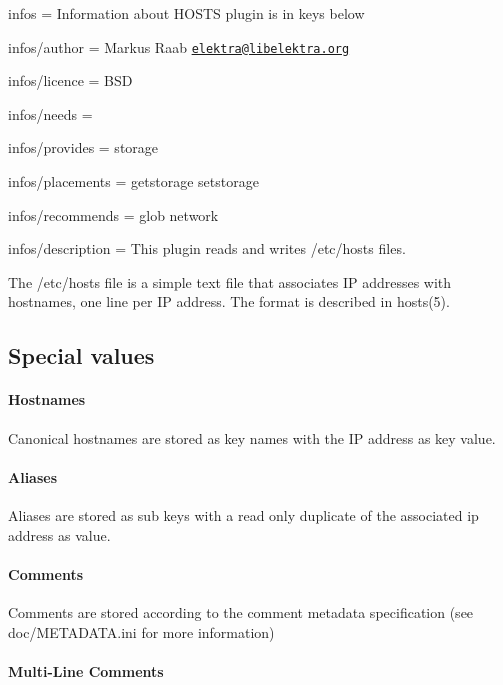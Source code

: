 
\begin{DoxyItemize}
\item infos = Information about H\+O\+S\+T\+S plugin is in keys below
\item infos/author = Markus Raab \href{mailto:elektra@libelektra.org}{\tt elektra@libelektra.\+org}
\item infos/licence = B\+S\+D
\item infos/needs =
\item infos/provides = storage
\item infos/placements = getstorage setstorage
\item infos/recommends = glob network
\item infos/description = This plugin reads and writes /etc/hosts files.
\end{DoxyItemize}

The /etc/hosts file is a simple text file that associates I\+P addresses with hostnames, one line per I\+P address. The format is described in hosts(5).

\subsection*{Special values}

\paragraph*{Hostnames}

Canonical hostnames are stored as key names with the I\+P address as key value.

\paragraph*{Aliases}

Aliases are stored as sub keys with a read only duplicate of the associated ip address as value.

\paragraph*{Comments}

Comments are stored according to the comment metadata specification (see doc/\+M\+E\+T\+A\+D\+A\+T\+A.\+ini for more information)

\paragraph*{Multi-\/\+Line Comments}

